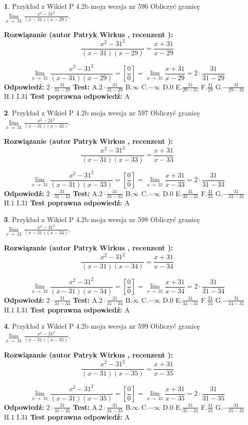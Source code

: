 \documentclass[12pt, a4paper]{article}
\theoremstyle{definition} %
\newtheorem{zad}{}
\newcommand{\zadStart}[1]{\begin{zad}#1\newline}
\newcommand{\zadStop}{\end{zad}}
\newcommand{\rozwStart}[2]{\noindent \textbf{Rozwiązanie (autor #1 , recenzent #2): }\newline}
\newcommand{\rozwStop}{\newline}
\newcommand{\odpStart}{\noindent \textbf{Odpowiedź:}\newline}
\newcommand{\odpStop}{\newline}
\newcommand{\testStart}{\noindent \textbf{Test:}\newline}
\newcommand{\testStop}{\newline}
\newcommand{\kluczStart}{\noindent \textbf{Test poprawna odpowiedź:}\newline}
\newcommand{\kluczStop}{\newline}
\begin{document}
\zadStart{Przykład z Wikieł P 4.2b moja wersja nr 596}
Obliczyć granicę $\lim\limits_{x\to\ 31}\frac{x^{2}-31^{2}}{(x-31)(x-29)}$.
\zadStop
\rozwStart{Patryk Wirkus}{}
$$\frac{x^{2}-31^{2}}{(x-31)(x-29)}=\frac{x+31}{x-29}$$

$$\lim\limits_{x\to\ 31}\frac{x^{2}-31^{2}}{(x-31)(x-29)}=[\frac{0}{0}]=\lim\limits_{x\to\ 31}\frac{x+31}{x-29}=2 \cdot \frac{31}{31-29}$$
\rozwStop
\odpStart
$2 \cdot \frac{31}{31-29}$
\odpStop
\testStart
A.$2 \cdot \frac{31}{31-29}$
B.$\infty$
C.$-\infty$
D.$0$
E.$\frac{31}{29-31}$
F.$\frac{31}{29}$
G.$-\frac{31}{29-31}$
H.$1$
I.$31$
\testStop
\kluczStart
A
\kluczStop



\zadStart{Przykład z Wikieł P 4.2b moja wersja nr 597}
Obliczyć granicę $\lim\limits_{x\to\ 31}\frac{x^{2}-31^{2}}{(x-31)(x-33)}$.
\zadStop
\rozwStart{Patryk Wirkus}{}
$$\frac{x^{2}-31^{2}}{(x-31)(x-33)}=\frac{x+31}{x-33}$$

$$\lim\limits_{x\to\ 31}\frac{x^{2}-31^{2}}{(x-31)(x-33)}=[\frac{0}{0}]=\lim\limits_{x\to\ 31}\frac{x+31}{x-33}=2 \cdot \frac{31}{31-33}$$
\rozwStop
\odpStart
$2 \cdot \frac{31}{31-33}$
\odpStop
\testStart
A.$2 \cdot \frac{31}{31-33}$
B.$\infty$
C.$-\infty$
D.$0$
E.$\frac{31}{33-31}$
F.$\frac{31}{33}$
G.$-\frac{31}{33-31}$
H.$1$
I.$31$
\testStop
\kluczStart
A
\kluczStop



\zadStart{Przykład z Wikieł P 4.2b moja wersja nr 598}
Obliczyć granicę $\lim\limits_{x\to\ 31}\frac{x^{2}-31^{2}}{(x-31)(x-34)}$.
\zadStop
\rozwStart{Patryk Wirkus}{}
$$\frac{x^{2}-31^{2}}{(x-31)(x-34)}=\frac{x+31}{x-34}$$

$$\lim\limits_{x\to\ 31}\frac{x^{2}-31^{2}}{(x-31)(x-34)}=[\frac{0}{0}]=\lim\limits_{x\to\ 31}\frac{x+31}{x-34}=2 \cdot \frac{31}{31-34}$$
\rozwStop
\odpStart
$2 \cdot \frac{31}{31-34}$
\odpStop
\testStart
A.$2 \cdot \frac{31}{31-34}$
B.$\infty$
C.$-\infty$
D.$0$
E.$\frac{31}{34-31}$
F.$\frac{31}{34}$
G.$-\frac{31}{34-31}$
H.$1$
I.$31$
\testStop
\kluczStart
A
\kluczStop



\zadStart{Przykład z Wikieł P 4.2b moja wersja nr 599}
Obliczyć granicę $\lim\limits_{x\to\ 31}\frac{x^{2}-31^{2}}{(x-31)(x-35)}$.
\zadStop
\rozwStart{Patryk Wirkus}{}
$$\frac{x^{2}-31^{2}}{(x-31)(x-35)}=\frac{x+31}{x-35}$$

$$\lim\limits_{x\to\ 31}\frac{x^{2}-31^{2}}{(x-31)(x-35)}=[\frac{0}{0}]=\lim\limits_{x\to\ 31}\frac{x+31}{x-35}=2 \cdot \frac{31}{31-35}$$
\rozwStop
\odpStart
$2 \cdot \frac{31}{31-35}$
\odpStop
\testStart
A.$2 \cdot \frac{31}{31-35}$
B.$\infty$
C.$-\infty$
D.$0$
E.$\frac{31}{35-31}$
F.$\frac{31}{35}$
G.$-\frac{31}{35-31}$
H.$1$
I.$31$
\testStop
\kluczStart
A
\kluczStop
\end{document}
